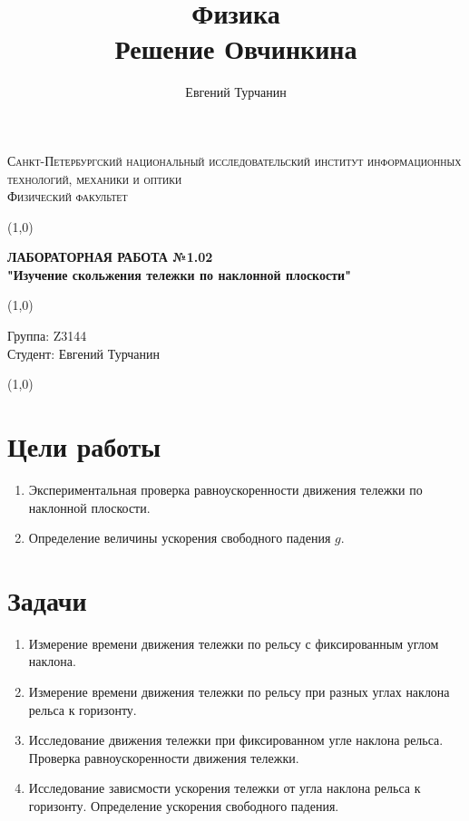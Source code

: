 \documentclass[a4paper]{article}
\title{\Huge{Физика}\\ Решение Овчинкина}
\author{\huge{Евгений Турчанин}}
\date{}
\begin{document}
\begin{center}
\textsc{Санкт-Петербургский национальный исследовательский институт информационных технологий, механики и оптики\\[3mm]
Физический факультет} \\[3mm]

\end{center}
\vspace{5mm}
\line(1,0){\textwidth}
\begin{center}
\textbf{ЛАБОРАТОРНАЯ РАБОТА №1.02\\}
\textbf{"Изучение скольжения тележки по наклонной плоскости"}
\end{center}
\vspace{2mm}
\line(1,0){\textwidth}
\vspace{5mm}
\begin{minipage}{0.4\textwidth}
    Группа: Z3144 \\
    Студент: Евгений Турчанин\\
    \vspace{1mm}
\end{minipage}
\hfill
\vspace{1mm}
\line(1,0){\textwidth}


\section{Цели работы}
\begin{enumerate}
	\item Экспериментальная проверка равноускоренности движения тележки по наклонной плоскости.
	\item Определение величины ускорения свободного падения $g$.
\end{enumerate}


\section{Задачи}
\begin{enumerate}
	\item Измерение времени движения тележки по рельсу с фиксированным углом наклона.

	\item Измерение времени движения тележки по рельсу при разных углах наклона рельса к горизонту.

	\item Исследование движения тележки при фиксированном угле наклона рельса. Проверка равноускоренности движения тележки.
	
	\item Исследование зависмости ускорения тележки от угла наклона рельса к горизонту. Определение ускорения свободного падения.
\end{enumerate}
\end{document}
